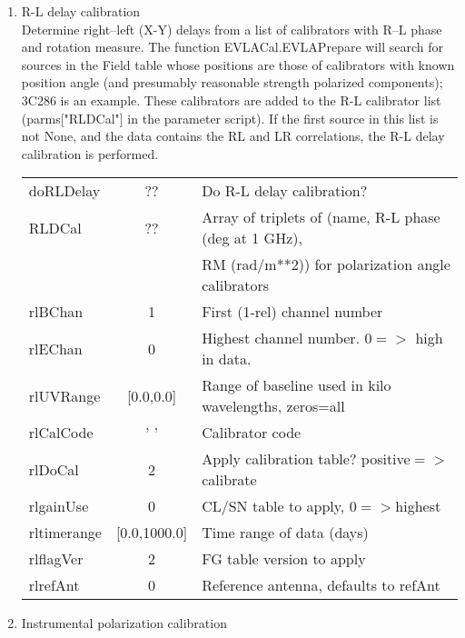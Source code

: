 \documentclass[11pt]{article}
\begin{document}
\begin{enumerate}
\begin{center}
\end{center}
%
\newpage
\item R-L  delay calibration\\
Determine right--left (X-Y) delays from a list of calibrators with R--L
phase and rotation measure.
The function EVLACal.EVLAPrepare will search for sources in the Field
table whose positions are those of calibrators with known position
angle (and presumably reasonable strength polarized components);
3C286 is an example.
These calibrators are added to the R-L calibrator list (parms["RLDCal"]
in the parameter script).
If the first source in this list is not None, and the data contains
the RL and LR correlations, the R-L delay calibration is performed. \\
\begin{center}
\begin{tabular}{|l|c|l|}
\hline
doRLDelay   & ?? &  Do R-L delay calibration?\\
RLDCal      & ?? &  Array of triplets of (name, R-L phase (deg at 1 GHz), \\
            &    &  RM (rad/m**2)) for polarization angle calibrators\\
rlBChan     & 1            & First (1-rel) channel number\\
rlEChan     & 0            & Highest channel number. $0=>$ high in data. \\
rlUVRange   &  [0.0,0.0]   & Range of baseline used in kilo wavelengths, zeros=all\\
rlCalCode   & '  '         & Calibrator code\\
rlDoCal     & 2            & Apply calibration table? positive$=>$calibrate\\
rlgainUse   & 0            & CL/SN table to apply, $0=>$highest\\
rltimerange & [0.0,1000.0] & Time range of data (days)\\
rlflagVer   & 2            & FG table version to apply \\
rlrefAnt    & 0            & Reference antenna, defaults to refAnt\\
\hline
\end{tabular}
\end{center}
%
\newpage
\item Instrumental polarization calibration\\

\end{enumerate}
\end{document}
